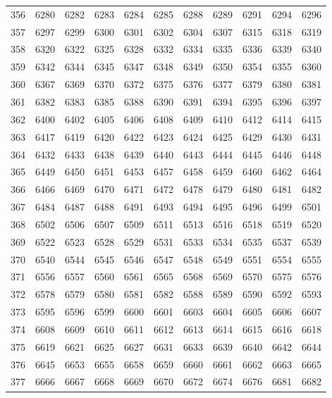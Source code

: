 \begin{longtable}{|r|rrrrrrrrrr|}
  356 & 6280 & 6282 & 6283 & 6284 & 6285 & 6288 & 6289 & 6291 & 6294 & 6296 \\ 
  357 & 6297 & 6299 & 6300 & 6301 & 6302 & 6304 & 6307 & 6315 & 6318 & 6319 \\ 
  358 & 6320 & 6322 & 6325 & 6328 & 6332 & 6334 & 6335 & 6336 & 6339 & 6340 \\ 
  359 & 6342 & 6344 & 6345 & 6347 & 6348 & 6349 & 6350 & 6354 & 6355 & 6360 \\ 
  360 & 6367 & 6369 & 6370 & 6372 & 6375 & 6376 & 6377 & 6379 & 6380 & 6381 \\ 
  361 & 6382 & 6383 & 6385 & 6388 & 6390 & 6391 & 6394 & 6395 & 6396 & 6397 \\ 
  362 & 6400 & 6402 & 6405 & 6406 & 6408 & 6409 & 6410 & 6412 & 6414 & 6415 \\ 
  363 & 6417 & 6419 & 6420 & 6422 & 6423 & 6424 & 6425 & 6429 & 6430 & 6431 \\ 
  364 & 6432 & 6433 & 6438 & 6439 & 6440 & 6443 & 6444 & 6445 & 6446 & 6448 \\ 
  365 & 6449 & 6450 & 6451 & 6453 & 6457 & 6458 & 6459 & 6460 & 6462 & 6464 \\ 
  366 & 6466 & 6469 & 6470 & 6471 & 6472 & 6478 & 6479 & 6480 & 6481 & 6482 \\ 
  367 & 6484 & 6487 & 6488 & 6491 & 6493 & 6494 & 6495 & 6496 & 6499 & 6501 \\ 
  368 & 6502 & 6506 & 6507 & 6509 & 6511 & 6513 & 6516 & 6518 & 6519 & 6520 \\ 
  369 & 6522 & 6523 & 6528 & 6529 & 6531 & 6533 & 6534 & 6535 & 6537 & 6539 \\ 
  370 & 6540 & 6544 & 6545 & 6546 & 6547 & 6548 & 6549 & 6551 & 6554 & 6555 \\ 
  371 & 6556 & 6557 & 6560 & 6561 & 6565 & 6568 & 6569 & 6570 & 6575 & 6576 \\ 
  372 & 6578 & 6579 & 6580 & 6581 & 6582 & 6588 & 6589 & 6590 & 6592 & 6593 \\ 
  373 & 6595 & 6596 & 6599 & 6600 & 6601 & 6603 & 6604 & 6605 & 6606 & 6607 \\ 
  374 & 6608 & 6609 & 6610 & 6611 & 6612 & 6613 & 6614 & 6615 & 6616 & 6618 \\ 
  375 & 6619 & 6621 & 6625 & 6627 & 6631 & 6633 & 6639 & 6640 & 6642 & 6644 \\ 
  376 & 6645 & 6653 & 6655 & 6658 & 6659 & 6660 & 6661 & 6662 & 6663 & 6665 \\ 
  377 & 6666 & 6667 & 6668 & 6669 & 6670 & 6672 & 6674 & 6676 & 6681 & 6682 \\ 

\end{longtable}
